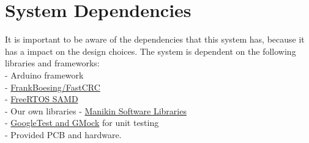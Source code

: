\section {System Dependencies}
It is important to be aware of the dependencies that this system has, because it has a impact on the design choices. 
The system is dependent on the following libraries and frameworks: \\
- Arduino framework \\
- \href{https://github.com/FrankBoesing/FastCRC}{FrankBoesing/FastCRC} \\
- \href{https://github.com/BriscoeTech/Arduino-FreeRTOS-SAMD21}{FreeRTOS SAMD} \\
- Our own libraries - \href{https://github.com/RobotPatient/Manikin_Software_Libraries}{Manikin Software Libraries} \\
- \href{https://github.com/google/googletest}{GoogleTest and GMock} for unit testing \\
- Provided PCB and hardware.
